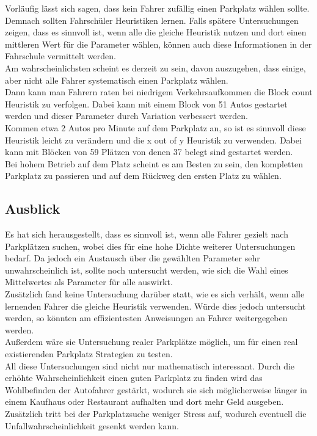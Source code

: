 Vorläufig lässt sich sagen, dass kein Fahrer zufällig einen Parkplatz wählen sollte. Demnach sollten Fahrschüler Heuristiken lernen. Falls spätere Untersuchungen zeigen, dass es sinnvoll ist, wenn alle die gleiche Heuristik nutzen und dort einen mittleren Wert für die Parameter wählen, können auch diese Informationen in der Fahrschule vermittelt werden.\\
Am wahrscheinlichsten scheint es derzeit zu sein, davon auszugehen, dass einige, aber nicht alle Fahrer systematisch einen Parkplatz wählen. \\
 Dann kann man Fahrern raten bei niedrigem Verkehrsaufkommen die Block count Heuristik zu verfolgen. Dabei kann mit einem Block von 51 Autos gestartet werden und dieser Parameter durch Variation verbessert werden.\\
 Kommen etwa 2 Autos pro Minute auf dem Parkplatz an, so ist es sinnvoll diese Heuristik leicht zu verändern und die x out of y Heuristik zu verwenden. Dabei kann mit Blöcken von 59 Plätzen von denen 37 belegt sind gestartet werden.\\
 Bei hohem Betrieb auf dem Platz scheint es am Besten zu sein, den kompletten Parkplatz zu passieren und auf dem Rückweg den ersten Platz zu wählen.\\
 
 \subsection{Ausblick}

Es hat sich herausgestellt, dass es sinnvoll ist, wenn alle Fahrer gezielt nach Parkplätzen suchen, wobei dies für eine hohe Dichte weiterer Untersuchungen bedarf. Da jedoch ein Austausch über die gewählten Parameter sehr unwahrscheinlich ist, sollte noch untersucht werden, wie sich die Wahl eines Mittelwertes als Parameter für alle auswirkt.\\
Zusätzlich fand keine Untersuchung darüber statt, wie es sich verhält, wenn alle lernenden Fahrer die gleiche Heuristik verwenden. Würde dies jedoch untersucht werden, so könnten am effizientesten Anweisungen an Fahrer weitergegeben werden. \\
Außerdem wäre sie Untersuchung realer Parkplätze möglich, um für einen real existierenden Parkplatz Strategien zu testen.\\
All diese Untersuchungen sind nicht nur mathematisch interessant. Durch die erhöhte Wahrscheinlichkeit einen guten Parkplatz zu finden wird das Wohlbefinden der Autofahrer gestärkt, wodurch sie sich möglicherweise länger in einem Kaufhaus oder Restaurant aufhalten und dort mehr Geld ausgeben. Zusätzlich tritt bei der Parkplatzsuche weniger Stress auf, wodurch eventuell die Unfallwahrscheinlichkeit gesenkt werden kann.